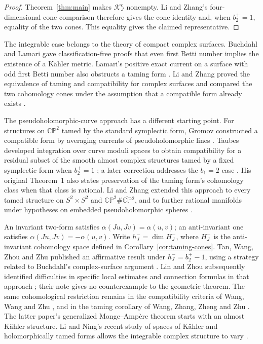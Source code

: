 \begin{proof}
Theorem~\ref{thm:main} makes \(\mathcal K_J^c\) nonempty. Li and Zhang's
four-dimensional cone comparison \cite[Corollary~1.1]{LiZhang2009}
therefore gives the cone identity and, when \(b_2^+=1\), equality of
the two cones. This equality gives the claimed representative.
\end{proof}

The integrable case belongs to the theory of compact complex surfaces.
Buchdahl \cite[Theorem~11]{Buchdahl1999} and Lamari
\cite[Corollary~5.7]{Lamari1999} gave classification-free proofs
that even first Betti number implies the existence of a K\"ahler metric.
Lamari's positive exact current on a surface with odd first Betti number
also obstructs a taming form \cite[Theorem~6.1]{Lamari1999}.
Li and Zhang proved the equivalence of taming and compatibility for
complex surfaces and compared the two cohomology cones under the
assumption that a compatible form already exists
\cite[Theorem~1.2 and Corollary~1.1]{LiZhang2009}.

The pseudoholomorphic-curve approach has a different starting point.
For structures on \(\mathbb{CP}^2\) tamed by the standard symplectic
form, Gromov constructed a compatible form by averaging currents
of pseudoholomorphic lines \cite[Section~2.4.A$'$]{Gromov1985}.
Taubes developed integration over curve moduli spaces to obtain
compatibility for a residual subset of the smooth almost complex
structures tamed by a fixed symplectic form when \(b_2^+=1\)
\cite[Theorem~1]{Taubes2011}; a later correction addresses the
\(b_1=2\) case \cite[Section~1]{Taubes2017}.
His original Theorem~1 also states preservation of the taming
form's cohomology class when that class is rational.
Li and Zhang extended this approach to every tamed structure on
\(S^2\times S^2\) and
\(\mathbb{CP}^2\#\overline{\mathbb{CP}}{}^2\), and to further
rational manifolds under hypotheses on embedded pseudoholomorphic
spheres \cite[Theorems~1.2 and~1.3]{LiZhang2015}.

An invariant two-form satisfies
\(\alpha(Ju,Jv)=\alpha(u,v)\); an anti-invariant one satisfies
\(\alpha(Ju,Jv)=-\alpha(u,v)\).
Write \(h_J^-=\dim H_J^-\), where \(H_J^-\) is the anti-invariant
cohomology space defined in Corollary~\ref{cor:taming-cones}.
Tan, Wang, Zhou and Zhu published an affirmative result under
\(h_J^-=b_2^+-1\), using a strategy related to Buchdahl's
complex-surface argument \cite[Theorem~1.1]{TWZZ2022}.
Lin and Zhou subsequently identified difficulties in specific local
estimates and connection formulas in that approach
\cite[Remarks~3.4 and~3.6, Section~3.2]{LinZhou2025}; their note gives no counterexample
to the geometric theorem.
The same cohomological restriction remains in the compatibility
criteria of Wang, Wang and Zhu
\cite[Theorems~4.3 and~5.1]{WangWangZhu2023}, and in the taming
corollary of Wang, Zhang, Zheng and Zhu
\cite[Corollary~1.3]{WangZhangZhengZhu2025}.
The latter paper's generalized Monge--Amp\`ere theorem starts with
an almost K\"ahler structure.
Li and Ning's recent study of spaces of K\"ahler and holomorphically
tamed forms allows the integrable complex structure to vary
\cite{LiNing2026}.

